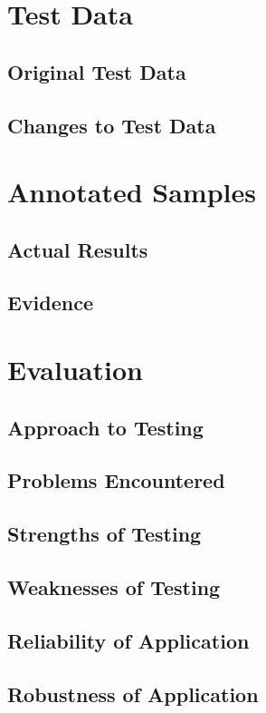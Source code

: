 \begin{landscape}
\begin{center}
\begin{longtable}{|p{1.5cm}|p{2cm}|p{2.5cm}|p{4cm}|p{2cm}|p{2cm}|p{1cm}|p{1.7cm}|}
    \end{longtable}
\end{center}

\section{Test Data}

\subsection{Original Test Data}

\subsection{Changes to Test Data}

\section{Annotated Samples}

\subsection{Actual Results}

\subsection{Evidence}

\end{landscape}

\section{Evaluation}

\subsection{Approach to Testing}

\subsection{Problems Encountered}

\subsection{Strengths of Testing}

\subsection{Weaknesses of Testing}

\subsection{Reliability of Application}

\subsection{Robustness of Application}